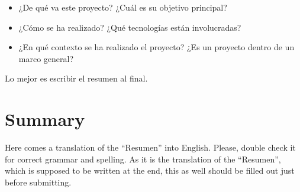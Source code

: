 \documentclass[
paper=a4,
fontsize=12pt,
twoside,
openright,                  %
titlepage,                  %
headsepline,                %
footheight=16pt,            %
parskip=half+,				%
numbers=noenddot,			%
headinclude=true,           %
footinclude=true,           %
cleardoublepage=empty,      %
captions=tableheading,      %
BCOR=12mm, 				    %
DIV=12   			        %
usegeometry=true			%
]{scrbook}
\begin{document}
{\begin{itemize}
  \item ¿De qué va este proyecto? ¿Cuál es su objetivo principal?
  \item ¿Cómo se ha realizado? ¿Qué tecnologías están involucradas?
  \item ¿En qué contexto se ha realizado el proyecto? ¿Es un proyecto dentro de un marco general?
\end{itemize}

Lo mejor es escribir el resumen al final.


\chapter*{Summary}

Here comes a translation of the ``Resumen'' into English. 
Please, double check it for correct grammar and spelling.
As it is the translation of the ``Resumen'', which is supposed to be written at the end, this as well should be filled out just before submitting.



\restoregeometry



\tableofcontents 

\cleardoublepage
\listoffigures %

}
\end{document}
